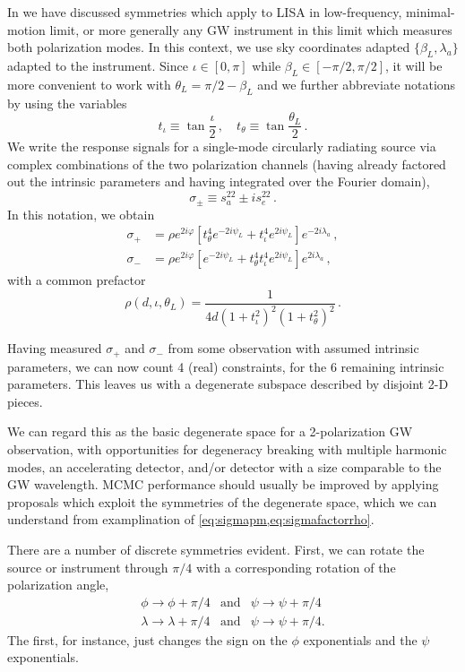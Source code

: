 \documentclass[aps,showpacs,twocolumn,prd,superscriptaddress,nofootinbib]{revtex4}
\newcommand{\be}{\begin{equation}}
\newcommand{\ee}{\end{equation}}
\newcommand{\bsub}{\begin{subequations}}
\newcommand{\esub}{\end{subequations}}
\newcommand\psiL{{\psi_{L}}}
\begin{document}
In \cite{MarsatEA2019} we have discussed symmetries which apply to LISA in low-frequency, minimal-motion limit, or more generally any GW instrument in this limit which measures both polarization modes. In this context, we use sky coordinates adapted $\{\beta_{L},\lambda_{a}\}$ adapted to the instrument. Since $\iota \in [0, \pi]$ while $\beta_{L} \in [-\pi/2, \pi/2]$, it will be more convenient to work with $\theta_{L} = \pi/2 - \beta_{L}$ and we further abbreviate notations by using the variables
\be
	t_{\iota} \equiv \tan \frac{\iota}{2} \,, \quad t_{\theta} \equiv \tan \frac{\theta_{L}}{2} \,.
\ee
We write the response signals for a single-mode circularly radiating source via complex combinations of the two polarization channels (having already factored out the intrinsic parameters and having integrated over the Fourier domain),
\be
	\sigma_{\pm} \equiv s_{a}^{22} \pm i s_{e}^{22} \,.
\ee
In this notation, we obtain
\bsub\label{eq:sigmapm}
\begin{align}
  \sigma_{+} &= \rho e^{2i\varphi} \left[ t_{\theta}^{4} e^{-2 i \psiL} + t_{\iota}^{4} e^{2 i \psiL} \right] e^{-2i \lambda_{a}} \,, \\
  \sigma_{-} &= \rho e^{2i\varphi} \left[ e^{-2 i \psiL} + t_{\theta}^{4} t_{\iota}^{4} e^{2 i \psiL} \right] e^{2i \lambda_{a}} \,,
\end{align}
\esub
with a common prefactor 
\be\label{eq:sigmafactorrho}
\rho(d, \iota, \theta_{L}) = \frac{1}{4d\left( 1 + t_{\iota}^{2} \right)^{2} \left(1 + t_{\theta}^{2} \right)^{2}} \,.
\ee

Having measured $\sigma_{+}$ and $\sigma_{-}$ from some observation with assumed intrinsic parameters, we can now count 4 (real) constraints, for the 6 remaining intrinsic parameters.  This leaves us with a degenerate subspace described by disjoint 2-D pieces.

We can regard this as the basic degenerate space for a 2-polarization GW observation, with opportunities for degeneracy breaking with multiple harmonic modes, an accelerating detector, and/or detector with a size comparable to the GW wavelength.  MCMC performance should usually be improved by applying proposals which exploit the symmetries of the degenerate space, which we can understand from examplination of \eqref{eq:sigmapm,eq:sigmafactorrho}.

There are a number of discrete symmetries evident. First, we can rotate the source or instrument through $\pi/4$ with a corresponding rotation of the polarization angle,
\begin{align}
  \phi\rightarrow\phi+\pi/4&\mathrm{and}&\psi\rightarrow\psi+\pi/4\\
  \lambda\rightarrow\lambda+\pi/4&\mathrm{and}&\psi\rightarrow\psi+\pi/4.
\end{align}
The first, for instance, just changes the sign on the $\phi$ exponentials and the $\psi$ exponentials. 
\end{document}
